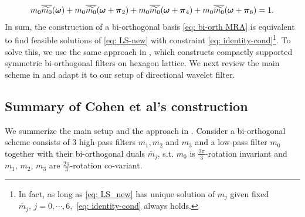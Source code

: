 \begin{align}\label{eq: identity-cond}
m_0\overline{\widetilde{m_{0}}}(\boldsymbol{\omega}) + m_0\overline{\widetilde{m_{0}}}(\boldsymbol{\omega} + \boldsymbol{\pi}_{2}) + m_0\overline{\widetilde{m_{0}}}(\boldsymbol{\omega} + \boldsymbol{\pi}_{4}) + m_0\overline{\widetilde{m_{0}}}(\boldsymbol{\omega} + \boldsymbol{\pi}_{6}) = 1.
\end{align}
In sum, the construction of a bi-orthogonal basis \eqref{eq: bi-orth MRA} is equivalent to find feasible solutions of \eqref{eq: LS-new} with constraint \eqref{eq: identity-cond}\footnote{In fact, as long as \eqref{eq: LS_new} has unique solution of $m_j$ given fixed $\widetilde{m_j}, \, j = 0,\cdots,6,$ \eqref{eq: identity-cond} always holds. }. To solve this, we use the same approach in \cite{cohen1993compactly}, which constructs compactly supported symmetric bi-orthogonal filters on hexagon lattice. We next review the main scheme in \cite{cohen1993compactly} and adapt it to our setup of directional wavelet filter.

\subsection{Summary of Cohen et al's construction}\label{subsec: cohen-summary}
We summerize the main setup and the approach in \cite{cohen1993compactly}. Consider a bi-orthogonal scheme consists of 3 high-pass filters $m_1,m_2$ and $m_3$ and a low-pass filter $m_0$ together with their bi-orthogonal duals $\widetilde{m_j}$, s.t.
$m_0$ is $\frac{2\pi}{3}$-rotation invariant and $m_1,\, m_2,\, m_3$ are $\frac{2\pi}{3}$-rotation co-variant.


